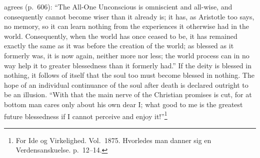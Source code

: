 \documentclass[12pt,a4paper]{article}
\newcommand{\opage}[1]{\marginnote{\footnotesize\textit{[#1]}}}
\begin{document}
agrees (p.\ 606): ``The All-One Unconscious is omniscient and all-wise,
and consequently cannot become wiser than it already is; it has, as
Aristotle too says, no memory, so it can learn nothing from the
experiences it otherwise had in the world. Consequently, when the world
has once ceased to be, it has remained exactly the same as it was before
the creation of the world; as blessed as it formerly was, it is now
again, neither more nor less; the world process can in no way help it to
greater blessedness than it formerly had.'' If the deity is blessed in
nothing, it follows of itself that the soul too must become blessed in
nothing. The hope of an individual continuance of the soul after death
is declared outright to be an illusion.
\opage{49}``With that the main nerve of the Christian promises is cut, for at
bottom man cares only about his own dear I; what good to me is the
greatest future blessedness if I cannot perceive and enjoy
it!''\footnote{For Ide og Virkelighed. Vol.\ 1875. Hvorledes man danner sig en
Verdensanskuelse. p.\ 12--14.} %
\end{document}
